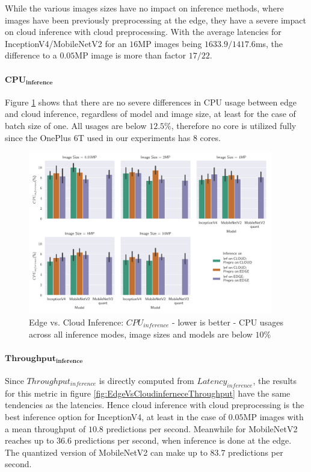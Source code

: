 While the various images sizes have no impact on inference methods, where images have been previously preprocessing at the edge, they have a severe impact on cloud inference with cloud preprocessing.
With the average latencies for InceptionV4/MobileNetV2 for an $16$MP images being $1633.9/1417.6$ms, the difference to a $0.05$MP image is more than factor $17/22$.

\paragraph{$\mathbf{CPU_{inference}}$}
Figure \ref{fig:EdgeVsCloudInferenceCPU} shows that there are no severe differences in CPU usage between edge and cloud inference, regardless of model and image size, at least for the case of batch size of one.
All usages are below $12.5\%$, therefore no core is utilized fully since the OnePlus 6T used in our experiments has $8$ cores.


\begin{figure}[!htb]
\centering
\includegraphics[width=0.95\textwidth]{./Bilder/single_plots/edge_vs_cloud_plots/Edge_vs_Cloud_Inference_Inference_CPU.pdf}
\caption[Edge vs. Cloud Inference:  $CPU_{inference}$ - lower is better]{Edge vs. Cloud Inference:  $CPU_{inference}$ - lower is better -
CPU usages across all inference modes, image sizes and models are below $10\%$}
\label{fig:EdgeVsCloudInferenceCPU}
\end{figure}


\paragraph{$\mathbf{Throughput_{inference}}$}
Since $Throughput_{inference}$ is directly computed from $Latency_{inference}$, the results for this metric in figure \ref{fig:EdgeVsCloudinferneceThroughput} have the same tendencies as the latencies.
Hence cloud inference with cloud preprocessing is the best inference option for InceptionV4, at least in the case of $0.05$MP images with a mean throughput of $10.8$ predictions per second.
Meanwhile for MobileNetV2 reaches up to $36.6$ predictions per second, when inference is done at the edge.
The quantized version of MobileNetV2 can make up to $83.7$ predictions per second.

